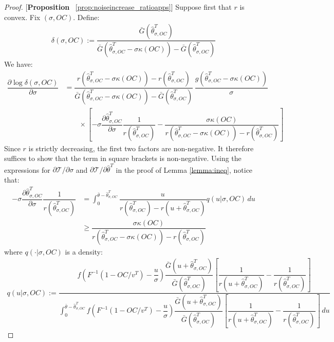 \begin{proof}{[\textbf{Proposition} ~\ref{prop:noiseincrease_ratioapps}]}
Suppose first that $r$ is convex. Fix $(\sigma,OC)$.  Define:
\begin{align*}
    \delta(\sigma,OC) := \dfrac{\bar{G}(\hat{\theta}^T_{\sigma,OC})}{\bar{G}(\hat{\theta}^T_{\sigma,OC}-\sigma \kappa(OC)) - \bar{G}(\hat{\theta}^T_{\sigma,OC})} 
\end{align*} 
We have:
\begin{align*}
    \dfrac{\partial \log \delta(\sigma,OC)}{\partial \sigma} 
    &= \dfrac{r(\hat{\theta}^T_{\sigma,OC}-\sigma \kappa(OC))-r(\hat{\theta}^T_{\sigma,OC})}{\bar{G}(\hat{\theta}^T_{\sigma,OC}-\sigma \kappa(OC)) - \bar{G}(\hat{\theta}^T_{\sigma,OC})}\,\dfrac{g(\hat{\theta}^T_{\sigma,OC}-\sigma \kappa(OC))}{\sigma} \\
    &\qquad \times \left[-\sigma \dfrac{\partial \hat{\theta}^T_{\sigma,OC}}{\partial \sigma}\dfrac{1}{r(\hat{\theta}^T_{\sigma,OC})} - \dfrac{\sigma \kappa(OC)}{r(\hat{\theta}^T_{\sigma,OC}-\sigma \kappa(OC))-r(\hat{\theta}^T_{\sigma,OC})}\right]
\end{align*}
Since $r$ is strictly decreasing, the first two factors are non-negative. It therefore suffices to show that the term in square brackets is non-negative. Using the expressions for $\partial \mathcal{T}/\partial \sigma$ and $\partial \mathcal{T}/\partial \hat{\theta}^T$ in the proof of Lemma \ref{lemma:ineq}, notice that:
\begin{align*}
    -\sigma \dfrac{\partial \hat{\theta}^T_{\sigma,OC}}{\partial \sigma}\dfrac{1}{r(\hat{\theta}^T_{\sigma,OC})} &= \int_{0}^{\bar{\theta}-\hat{\theta}^T_{\sigma,OC}}\dfrac{u}{r(\hat{\theta}^T_{\sigma,OC})-r(u+\hat{\theta}^T_{\sigma,OC})} q(u|\sigma,OC)\,du \\
    &\geq \dfrac{\sigma \kappa(OC)}{r(\hat{\theta}^T_{\sigma,OC}-\sigma \kappa(OC))-r(\hat{\theta}^T_{\sigma,OC})}
\end{align*}
where $q(\cdot|\sigma,OC)$ is a density:
\begin{align*}
    q(u|\sigma,OC) := \dfrac{f\left(F^{-1}(1-OC/v^T)-\dfrac{u}{\sigma}\right)\dfrac{\bar{G}(u+\hat{\theta}^T_{\sigma,OC})}{\bar{G}(\hat{\theta}^T_{\sigma,OC})}\left[\dfrac{1}{r(u+\hat{\theta}^T_{\sigma,OC})} - \dfrac{1}{r(\hat{\theta}^T_{\sigma,OC})}\right]}{\int_{0}^{\bar{\theta} - \hat{\theta}^T_{\sigma,OC}} f\left(F^{-1}(1-OC/v^T)-\dfrac{u}{\sigma}\right)\dfrac{\bar{G}(u+\hat{\theta}^T_{\sigma,OC})}{\bar{G}(\hat{\theta}^T_{\sigma,OC})}\left[\dfrac{1}{r(u+\hat{\theta}^T_{\sigma,OC})} - \dfrac{1}{r(\hat{\theta}^T_{\sigma,OC})}\right]\,du}

\end{align*}
\end{proof}

